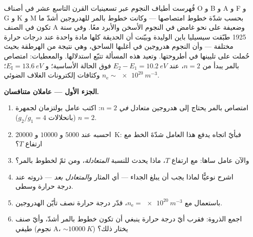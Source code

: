 \begin{problem}\label{pb:b3:grand-canonical:1}
فُهرست أطياف النجوم عبر تسعينيات القرن التاسع عشر في أصناف
O و B و A و F و G و K و M بحسب شدّة خطوط امتصاصها ---
وكانت خطوط بالمر للهدروجين أشدّ ما تكون في الصنف A وضعيفة على نحو
غامض في النجوم الأسخن والأبرد معًا. وفي سنة 1925 طبّقت سيسيليا باين
 الوليدة وبيّنت أن الحديقة كلها
مادة واحدة عند درجات حرارة مختلفة --- وأن النجوم
هدروجين في أغلبها الساحق، وهي نتيجة من الهرطقة بحيث حُملت على
تليينها في أطروحتها. وتعيد هذه المسألة تتبّع استدلالها.
والمعطيات: امتصاص بالمر يبدأ من $n = 2$، عند $E_2 - E_1 =
\qty{10.2}{eV}$ فوق الحالة الأساسية؛ و $E_{\text{I}} =
\qty{13.6}{eV}$؛ وكثافات إلكترونات الغلاف الضوئي $n_{\text{e}}
\sim \qty{e20}{m^{-3}}$.

\medskip\noindent\textbf{الجزء الأول --- عاملان متنافسان.}
\begin{enumerate}
  \item امتصاص بالمر يحتاج إلى هدروجين متعادل \emph{في} $n =
        2$: اكتب عامل بولتزمان لجمهرة $n = 2$
        (بانحلالات $g_2/g_1 = 4$).
  \item احسبه عند $5000$ و $10000$ و \qty{20000}{K}: فبأيّ
        اتجاه يدفع هذا العامل شدّةَ الخط مع ارتفاع $T$؟
  \item والآن عامل ساها: مع ارتفاع $T$، ماذا يحدث للنسبة
        \emph{المتعادلة}، ومن ثمّ لخطوط بالمر؟
  \item اشرح نوعيًّا لماذا يجب أن يبلغ الجداء --- أي المثار
        \emph{والمتعادل بعد} --- ذروته عند درجة حرارة
        وسطى.
  \item باستعمال  مع $n_{\text{e}} =
        \qty{e20}{m^{-3}}$، قدّر درجة حرارة
        نصف تأيّن الهدروجين.
  \item اجمع الذروة: فقرب أيّ درجة حرارة ينبغي أن تكون
        خطوط بالمر أشدّ، وأيّ صنف طيفي
        (نجوم A، $\sim\qty{10000}{K}$) يختار ذلك؟
\end{enumerate}


\end{problem}

